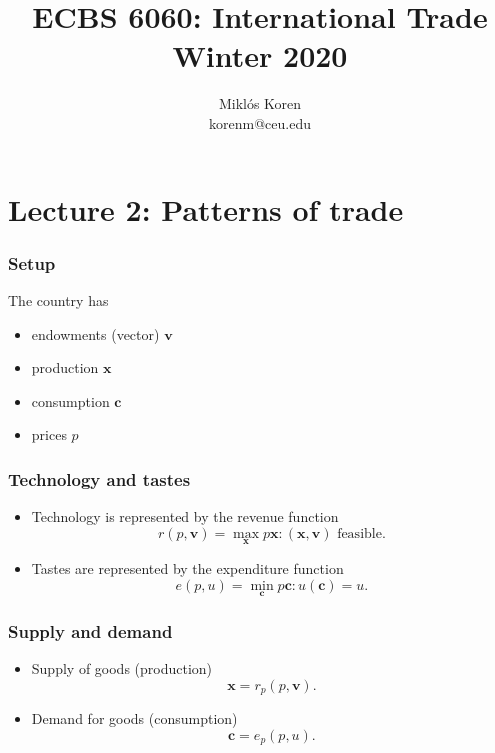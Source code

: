 \documentclass[compress,mathserif,aspectratio=169]{beamer}
\title{ECBS 6060: International Trade\\
Winter 2020}
\author{Mikl\'os Koren\\
korenm@ceu.edu}
\date %
{}
\begin{document}
\begin{frame}[plain]
  \titlepage
    \addtocounter{framenumber}{-1}
\end{frame}




\section{Lecture 2: Patterns of trade}\hypertarget{Lecture 2: Patterns of trade}{}


\begin{frame}\frametitle{Setup}\hypertarget{Setup}{}
The country has 
\begin{itemize}
\item endowments (vector) $\mathbf v$

\item production $\mathbf x$

\item consumption $\mathbf c$

\item prices $p$


\end{itemize}

\end{frame}



\begin{frame}\frametitle{Technology and tastes}\hypertarget{Technology and tastes}{}
\begin{itemize}
\item Technology is represented by the revenue function
\[
r(p,\mathbf v) = \max_{\mathbf x} p\mathbf x: (\mathbf x,\mathbf v) \text{ feasible}.
\]

\item Tastes are represented by the expenditure function
\[
e(p,u) = \min_{\mathbf c} p\mathbf c: u(\mathbf c)=u.
\]


\end{itemize}
\end{frame}



\begin{frame}\frametitle{Supply and demand}\hypertarget{Supply and demand}{}
\begin{itemize}
\item Supply of goods (production)
\[
\mathbf x = r_p(p,\mathbf v).
\]

\item Demand for goods (consumption)
\[
\mathbf c = e_p(p,u).
\]


\end{itemize}
\end{frame}
\end{document}
